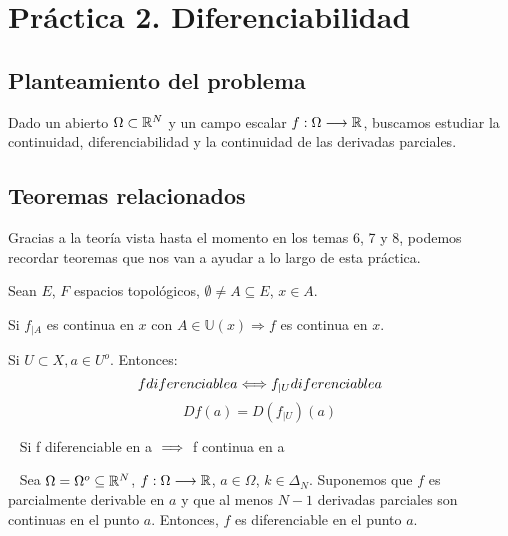 \chapter{Práctica 2. Diferenciabilidad}

\section{Planteamiento del problema}
\noindent
Dado un abierto $\Omega \subset \mathbb R^N$ y un campo escalar $f:\Omega \longrightarrow \mathbb R$, buscamos estudiar la continuidad, diferenciabilidad y la continuidad de las derivadas parciales.

\section{Teoremas relacionados}
\noindent
Gracias a la teoría vista hasta el momento en los temas 6, 7 y 8, podemos recordar teoremas que nos van a ayudar a lo largo de esta práctica.

\begin{teo}
    Sean $E$, $F$ espacios topológicos, $\emptyset \neq A \subseteq E$, $x \in A$.

    
    Si $f_{\big| A}$ es continua en $x$ con $A \in \mathbb{U}(x) \Rightarrow f$ es continua en $x$.
\end{teo}

\begin{prop}
    Si $U\subset X, a\in U^o$. \newline Entonces: 
    $$f \\ diferenciable \\ a \\ \Longleftrightarrow \\ f_{|U} \\ diferenciable\\ a$$
    $$Df(a) = D(f_{|U})(a)$$
\end{prop}

\begin{prop}
    \ \newline
    Si f diferenciable en a $\implies $ f continua en a 
\end{prop}

\begin{prop}
    \ \newline
    Sea $\Omega = \Omega^o  \subseteq \mathbb R^N$, $f:\Omega \longrightarrow \mathbb R$, $a \in \Omega$, $k \in \Delta_N$.\newline
    Suponemos que $f$ es parcialmente derivable en $a$ y que al menos $N-1$ derivadas parciales son continuas en el punto $a$.\newline
    Entonces, $f$ es diferenciable en el punto $a$.
\end{prop}

